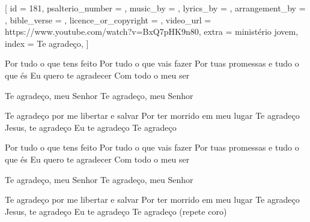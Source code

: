 [
    id                     = {181},
    psalterio_number       = {},
    music_by               = {},
    lyrics_by              = {},
    arrangement_by         = {},
    bible_verse            = {},
    licence_or_copyright   = {},
    video_url              = {https://www.youtube.com/watch?v=BxQ7pHK9n80},
    extra                  = {ministério jovem},
    index                  = {Te agradeço},
]

\beginverse
Por tudo o que tens feito
Por tudo o que vais fazer
Por tuas promessas e tudo o que és
Eu quero te agradecer
Com todo o meu ser
\endverse

\beginchorus
Te agradeço, meu Senhor
Te agradeço, meu Senhor

Te agradeço por me libertar e salvar
Por ter morrido em meu lugar
Te agradeço
Jesus, te agradeço
Eu te agradeço
Te agradeço
\endchorus

\beginverse
Por tudo o que tens feito
Por tudo o que vais fazer
Por tuas promessas e tudo o que és
Eu quero te agradecer
Com todo o meu ser
\endverse

\beginchorus
Te agradeço, meu Senhor
Te agradeço, meu Senhor

Te agradeço por me libertar e salvar
Por ter morrido em meu lugar
Te agradeço
Jesus, te agradeço
Eu te agradeço
Te agradeço (repete coro)
\endchorus

\endsong
